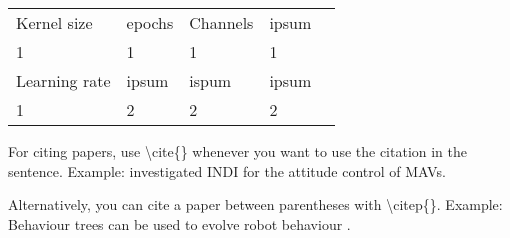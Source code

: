 \begin{table}[]
\begin{tabular}{lllll}
 Kernel size& epochs & Channels & ipsum &  \\
 1& 1 & 1 & 1 &  \\
 Learning rate& ipsum  & ispum & ipsum &  \\
 1& 2 & 2 & 2 & 
\end{tabular}
\end{table}


For citing papers, use \textbackslash cite\{\} whenever you want to use the citation in the sentence.
Example: \cite{smeur} investigated INDI for the attitude control of MAVs.

Alternatively, you can cite a paper between parentheses with \textbackslash citep\{\}.
Example: Behaviour trees can be used to evolve robot behaviour \citep{Scheper2016a}.